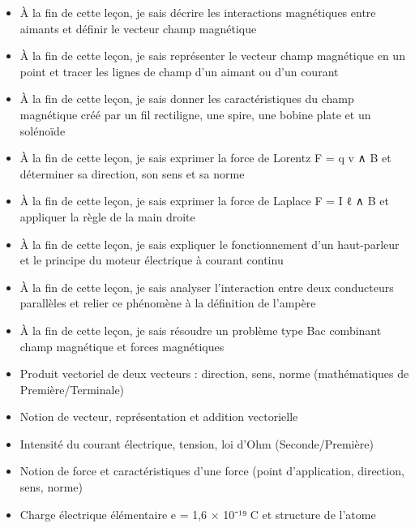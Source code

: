 \documentclass[11pt]{article}
\begin{document}
\begin{objectifs}
\begin{itemize}
\item À la fin de cette leçon, je sais décrire les interactions magnétiques entre aimants et définir le vecteur champ magnétique
\item À la fin de cette leçon, je sais représenter le vecteur champ magnétique en un point et tracer les lignes de champ d'un aimant ou d'un courant
\item À la fin de cette leçon, je sais donner les caractéristiques du champ magnétique créé par un fil rectiligne, une spire, une bobine plate et un solénoïde
\item À la fin de cette leçon, je sais exprimer la force de Lorentz F = q v ∧ B et déterminer sa direction, son sens et sa norme
\item À la fin de cette leçon, je sais exprimer la force de Laplace F = I ℓ ∧ B et appliquer la règle de la main droite
\item À la fin de cette leçon, je sais expliquer le fonctionnement d'un haut-parleur et le principe du moteur électrique à courant continu
\item À la fin de cette leçon, je sais analyser l'interaction entre deux conducteurs parallèles et relier ce phénomène à la définition de l'ampère
\item À la fin de cette leçon, je sais résoudre un problème type Bac combinant champ magnétique et forces magnétiques
\end{itemize}
\end{objectifs}

\begin{prerequis}
\begin{itemize}
\item Produit vectoriel de deux vecteurs : direction, sens, norme (mathématiques de Première/Terminale)
\item Notion de vecteur, représentation et addition vectorielle
\item Intensité du courant électrique, tension, loi d'Ohm (Seconde/Première)
\item Notion de force et caractéristiques d'une force (point d'application, direction, sens, norme)
\item Charge électrique élémentaire e = 1,6 × 10⁻¹⁹ C et structure de l'atome
\end{itemize}
\end{prerequis}

\newpage
\end{document}

